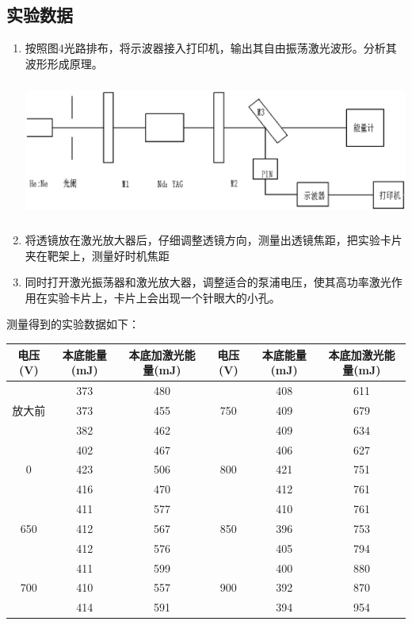 \documentclass[UTF8]{ctexart}
\makeatletter
\newcommand{\figcaption}{\def\@captype{figure}\caption}
\newcommand{\tabcaption}{\def\@captype{table}\caption}
\makeatother
\begin{document}
\subsection{实验数据}
	\begin{enumerate}
		\item 按照图4光路排布，将示波器接入打印机，输出其自由振荡激光波形。分析其波形形成原理。
		\begin{center}
		\includegraphics[width=15cm,height=4.5cm]{3.eps}
		\figcaption{光路排布}\label{3.eps}
		\end{center}
		\item 将透镜放在激光放大器后，仔细调整透镜方向，测量出透镜焦距，把实验卡片夹在靶架上，测量好时机焦距
		\item 同时打开激光振荡器和激光放大器，调整适合的泵浦电压，使其高功率激光作用在实验卡片上，卡片上会出现一个针眼大的小孔。
	\end{enumerate}
测量得到的实验数据如下：
\begin{center}
	\tabcaption{原始数据记录}
	\begin{tabular}{|c|c|c|c|c|c|}
		\hline
		电压(V)&本底能量(mJ)&本底加激光能量(mJ)&电压(V)&本底能量(mJ)&本底加激光能量(mJ)\\ \hline
		\multirow{3}{*}{放大前}&373&480&\multirow{3}{*}{750}&408&611\\
		\cline{2-3} \cline{5-6}	
						     &373&455& &409&679\\
		\cline{2-3}	\cline{5-6}
							 &382&462& &409&634\\	\hline
		\multirow{3}{*}{0}	 &402&467&\multirow{3}{*}{800}&406&627\\
		\cline{2-3} \cline{5-6}
							 &423&506& &421&751\\
		\cline{2-3} \cline{5-6}
							 &416&470& &412&761\\ \hline
		\multirow{3}{*}{650} &411&577&\multirow{3}{*}{850}&410&761\\ 
		\cline{2-3} \cline{5-6}
							 &412&567& &396&753\\
		\cline{2-3} \cline{5-6}
						   	 &412&576& &405&794\\ \hline
		\multirow{3}{*}{700} &411&599&\multirow{3}{*}{900}&400&880\\
		\cline{2-3} \cline{5-6}
							 &410&557& &392&870\\
		\cline{2-3} \cline{5-6}
							 &414&591& &394&954\\ \hline
	\end{tabular}
\end{center}
	
\end{document}
